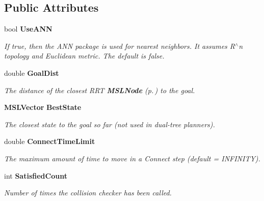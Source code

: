 \subsection*{Public Attributes}
\begin{CompactItemize}
\item 
bool {\bf Use\-ANN}
\begin{CompactList}\small\item\em If true, then the ANN package is used for nearest neighbors. It assumes R$^\wedge$n topology and Euclidean metric. The default is false.\item\end{CompactList}\item 
double {\bf Goal\-Dist}
\begin{CompactList}\small\item\em The distance of the closest RRT {\bf MSLNode} {\rm (p.\,\pageref{class_MSLNode})} to the goal.\item\end{CompactList}\item 
{\bf MSLVector} {\bf Best\-State}
\begin{CompactList}\small\item\em The closest state to the goal so far (not used in dual-tree planners).\item\end{CompactList}\item 
double {\bf Connect\-Time\-Limit}
\begin{CompactList}\small\item\em The maximum amount of time to move in a Connect step (default = INFINITY).\item\end{CompactList}\item 
int {\bf Satisfied\-Count}
\begin{CompactList}\small\item\em Number of times the collision checker has been called.\item\end{CompactList}\end{CompactItemize}
